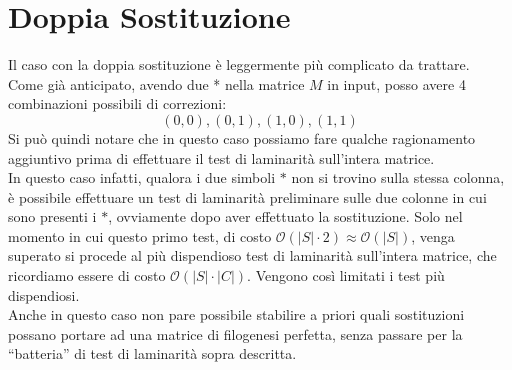 \documentclass[a4paper,12pt, oneside]{book}
\begin{document}
\section{Doppia Sostituzione}
Il caso con la doppia sostituzione è leggermente più complicato da trattare.\\
Come già anticipato, avendo due * nella matrice $M$ in input, posso avere 4
combinazioni possibili di correzioni:
\[(0,0),(0,1),(1,0),(1,1)\]
Si può quindi notare che in questo caso possiamo fare qualche ragionamento
aggiuntivo prima di effettuare il test di laminarità sull'intera matrice.\\
In questo caso infatti, qualora i due simboli $*$ non si trovino sulla stessa
colonna, è possibile effettuare un test di laminarità preliminare sulle due
colonne in cui sono presenti i $*$, ovviamente dopo aver effettuato la
sostituzione. Solo nel momento in cui questo primo test, di costo 
$\mathcal{O}(|S|\cdot 2)\approx\mathcal{O}(|S|)$, venga superato si procede al
più dispendioso test di laminarità sull'intera matrice, che ricordiamo essere di
costo $\mathcal{O}(|S|\cdot |C|)$. Vengono così limitati i test più
dispendiosi. \\ 
Anche in questo caso non pare possibile stabilire a priori quali sostituzioni
possano portare ad una matrice di filogenesi perfetta, senza passare per la
``batteria'' di test di laminarità sopra descritta.
\end{document}

